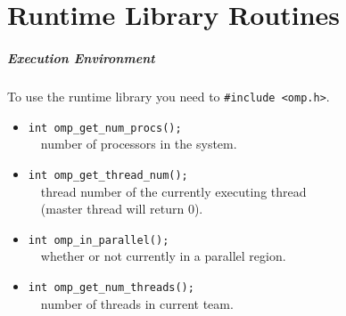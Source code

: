 \documentclass[aspectratio=43]{beamer}
\begin{document}
\part{Runtime Library Routines}
\frame{\partpage}
\begin{frame}[fragile]
  \frametitle{Execution Environment}

  To use the runtime library you need to {\tt \#include <omp.h>}.\\[1em]

  \begin{itemize}
    \item {\tt int omp\_get\_num\_procs();}\\
         ~~number of processors in the system.
    \item {\tt int omp\_get\_thread\_num();}\\
         ~~thread number of the currently executing thread\\
         ~~(master thread will return 0).
    \item {\tt int omp\_in\_parallel();}\\
         ~~whether or not currently in a parallel region.
    \item {\tt int omp\_get\_num\_threads();}\\
         ~~number of threads in current team.
  \end{itemize}
\end{frame}
\end{document}
